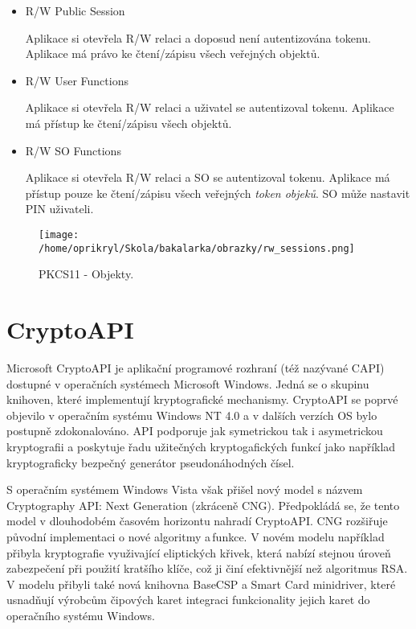 \documentclass[]{fithesis3}
\begin{document}
		\begin{itemize}
			\item R/W Public Session

			Aplikace si otevřela R/W relaci a doposud není autentizována tokenu. Aplikace má 				právo ke čtení/zápisu všech veřejných objektů.
	
			\item R/W User Functions

			Aplikace si otevřela R/W relaci a uživatel se autentizoval tokenu. Aplikace má přístup 			ke čtení/zápisu všech objektů.

			\item R/W SO Functions

			Aplikace si otevřela R/W relaci a SO se autentizoval tokenu. Aplikace má přístup 					pouze ke čtení/zápisu všech veřejných \textit{token objeků}. SO může nastavit PIN 				uživateli.
		\end{itemize}

		\begin{figure}[!ht]
  			\begin{minipage}{1.00\textwidth}
    				\texttt{[image: /home/oprikryl/Skola/bakalarka/obrazky/rw\_sessions.png]}
  			\end{minipage}
 			\caption{PKCS11 - Objekty.}
  			\label{fig:PKCS11 - Objekty.}
		\end{figure}	
		
\chapter{CryptoAPI}

Microsoft CryptoAPI je aplikační programové rozhraní (též nazývané CAPI) dostupné v operačních systémech Microsoft Windows. Jedná se o skupinu knihoven, které implementují kryptografické mechanismy. CryptoAPI se poprvé objevilo v operačním systému Windows NT 4.0 a v dalších verzích OS bylo postupně zdokonalováno. API podporuje jak symetrickou tak i asymetrickou kryptografii a poskytuje řadu užitečných kryptogafických funkcí jako například kryptograficky bezpečný generátor pseudonáhodných čísel. 

S operačním systémem Windows Vista však přišel nový model s názvem Cryptography API: Next Generation (zkráceně CNG). Předpokládá se, že tento model v dlouhodobém časovém horizontu nahradí CryptoAPI. CNG rozšiřuje původní implementaci o nové algoritmy a\,funkce. V novém modelu například přibyla kryptografie využivající eliptických křivek, která nabízí stejnou úroveň zabezpečení při použití kratšího klíče, což ji činí efektivnější než algoritmus RSA. V modelu přibyli také nová knihovna BaseCSP a Smart Card minidriver, které usnadňují výrobcům čipových karet integraci funkcionality jejich karet do operačního systému Windows.
\end{document}
